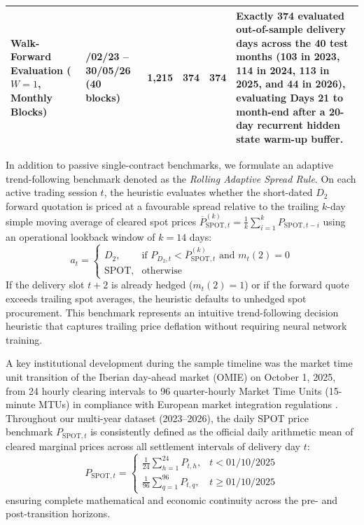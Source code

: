 \begin{table}[!t]
\begin{tabularx}{\linewidth}{@{} >{\raggedright\arraybackslash}p{2.8cm} >{\centering\arraybackslash}p{2.3cm} ccc >{\raggedright\arraybackslash}X@{}}
\midrule
Walk-Forward Evaluation ($W=1$, Monthly Blocks) & 01/02/23 -- 30/05/26 (40 blocks) & 1,215 & 374 & 374 & Exactly 374 evaluated out-of-sample delivery days across the 40 test months (103 in 2023, 114 in 2024, 113 in 2025, and 44 in 2026), evaluating Days 21 to month-end after a 20-day recurrent hidden state warm-up buffer. \\
\bottomrule
\end{tabularx}
\end{table}

In addition to passive single-contract benchmarks, we formulate an adaptive trend-following benchmark denoted as the \textit{Rolling Adaptive Spread Rule}. On each active trading session $t$, the heuristic evaluates whether the short-dated $D_2$ forward quotation is priced at a favourable spread relative to the trailing $k$-day simple moving average of cleared spot prices $\overline{P}_{\text{SPOT}, t}^{(k)} = \frac{1}{k} \sum_{i=1}^k P_{\text{SPOT}, t-i}$ using an operational lookback window of $k = 14$ days:
\begin{equation}
    a_t = 
    \begin{cases}
        D_2, & \text{if } P_{D_2, t} < \overline{P}_{\text{SPOT}, t}^{(k)} \text{ and } m_t(2) = 0 \\
        \text{SPOT}, & \text{otherwise}
    \end{cases}
    \label{eq:rolling_adaptive_rule}
\end{equation}
If the delivery slot $t+2$ is already hedged ($m_t(2) = 1$) or if the forward quote exceeds trailing spot averages, the heuristic defaults to unhedged spot procurement. This benchmark represents an intuitive trend-following decision heuristic that captures trailing price deflation without requiring neural network training.

A key institutional development during the sample timeline was the market time unit transition of the Iberian day-ahead market (OMIE) on October 1, 2025, from 24 hourly clearing intervals to 96 quarter-hourly Market Time Units (15-minute MTUs) in compliance with European market integration regulations \cite{omie2025mtu, iea2024electricity}. Throughout our multi-year dataset (2023--2026), the daily SPOT price benchmark $P_{\text{SPOT}, t}$ is consistently defined as the official daily arithmetic mean of cleared marginal prices across all settlement intervals of delivery day $t$:
\begin{equation}
    P_{\text{SPOT}, t} = 
    \begin{cases}
        \frac{1}{24} \sum_{h=1}^{24} P_{t, h}, & t < \text{01/10/2025} \\
        \frac{1}{96} \sum_{q=1}^{96} P_{t, q}, & t \ge \text{01/10/2025}
    \end{cases}
    \label{eq:mtu_standardization}
\end{equation}
ensuring complete mathematical and economic continuity across the pre- and post-transition horizons.

